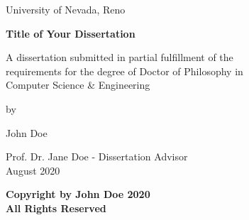 \documentclass[letterpaper,12pt]{report}
\begin{document}


\newpage
\thispagestyle{empty}
\singlespacing

\begin{center}

\null

\vspace{1.5in}

University of Nevada, Reno \\

\vspace{1.5in}

\textbf{Title of Your Dissertation}

\vspace{1.5in}
A dissertation submitted in partial fulfillment of the \\
requirements for the degree of Doctor of Philosophy in\\
Computer Science \& Engineering\\
\vspace{1in}

by

\vspace{0.25in}
John Doe
\vspace{0.5in}

Prof. Dr. Jane Doe - Dissertation Advisor \\
August 2020 \\

\end{center}

\newpage
\thispagestyle{empty}
\hbox{\hfil}\vspace{4in}\begin{center}
\textbf{Copyright by John Doe 2020\\
All Rights Reserved}
\end{center}


\end{document}

